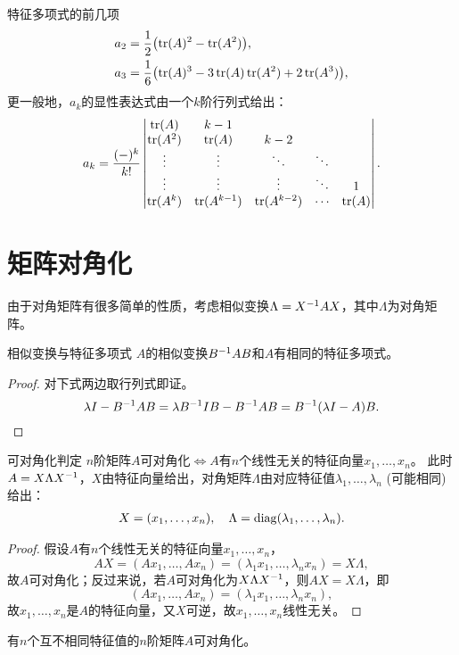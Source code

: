 \begin{example}
	{特征多项式的前几项}{}
	\begin{subequations}
		\begin{align}
			a_2&=\frac12\bigl(\operatorname{tr}(A)^2-\operatorname{tr}(A^2)\bigr),\\
			a_3&=\frac16\bigl(\operatorname{tr}(A)^3-3\operatorname{tr}(A)\operatorname{tr}(A^2)+2\operatorname{tr}(A^3)\bigr),
		\end{align}
	\end{subequations}
	更一般地，$a_k$的显性表达式由一个$k$阶行列式给出：
	\begin{equation}
		a_k=\frac{(-)^k}{k!}\begin{vmatrix}
			\operatorname{tr}(A)&k-1\\
			\operatorname{tr}(A^2)&\operatorname{tr}(A)&k-2\\
			\vdots&\vdots&\ddots&\ddots\\
			\vdots&\vdots&\vdots&\ddots&1\\
			\operatorname{tr}(A^k)&\operatorname{tr}(A^{k-1})&\operatorname{tr}(A^{k-2})&\cdots&\operatorname{tr}(A)
		\end{vmatrix}.
	\end{equation}
\end{example}

\section{矩阵对角化}

由于对角矩阵有很多简单的性质，考虑相似变换$\Lambda=X^{-1} AX$，其中$\Lambda$为对角矩阵。

\begin{theorem}{相似变换与特征多项式}{}
	$A$的相似变换$B^{-1} AB$和$A$有相同的特征多项式。
\end{theorem}
\begin{proof} 
	对下式两边取行列式即证。
	\[
		\lambda I-B^{-1} AB=\lambda B^{-1} IB-B^{-1} AB=B^{-1}(\lambda I-A)B.
		\qedhere
	\]
\end{proof}

\begin{theorem}{可对角化判定}{}
	$n$阶矩阵$A$可对角化$\iff A$有$n$个线性无关的特征向量$x_1,\ldots,x_n$。
	\tcblower
	此时$A=X\Lambda X^{-1}$，$X$由特征向量给出，对角矩阵$\Lambda$由对应特征值$\lambda_1,\ldots,\lambda_n$ (可能相同)给出：
	\begin{align}
		X=(x_1,\ldots,x_n),\quad\Lambda=\operatorname{diag}(\lambda_1,\ldots,\lambda_n).
	\end{align}
\end{theorem}
\begin{proof}
	假设$A$有$n$个线性无关的特征向量$x_1,\ldots,x_n$，
	\[
		AX=(Ax_1,\ldots,Ax_n)=(\lambda_1x_1,\ldots,\lambda_nx_n)=X\Lambda,
	\]
	故$A$可对角化；反过来说，若$A$可对角化为$X\Lambda X^{-1}$，则$AX=X\Lambda$，即
	\[
		(Ax_1,\ldots,Ax_n)=(\lambda_1x_1,\ldots,\lambda_nx_n),
	\]
	故$x_1,\ldots,x_n$是$A$的特征向量，又$X$可逆，故$x_1,\ldots,x_n$线性无关。
\end{proof}
\begin{corollary}
	有$n$个互不相同特征值的$n$阶矩阵$A$可对角化。
\end{corollary}

